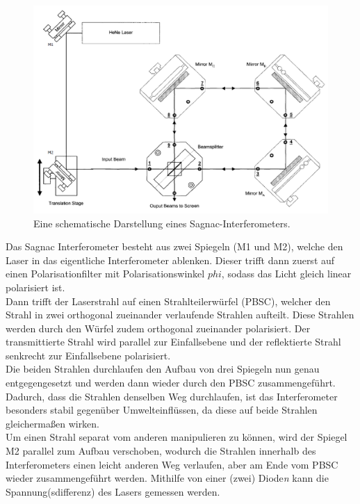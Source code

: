 \begin{figure}
    \centering
    \includegraphics[scale=0.4]{content/V64_pictures/Aufbau.png}
    \caption{Eine schematische Darstellung eines Sagnac-Interferometers. \cite{v64}}
    \label{fig:Aufbau}
\end{figure}
Das Sagnac Interferometer besteht aus zwei Spiegeln (M1 und M2), welche den Laser in das eigentliche Interferometer ablenken. Dieser trifft dann 
zuerst auf einen Polarisationfilter mit Polarisationswinkel $phi$, sodass das Licht gleich linear polarisiert ist.\\
Dann trifft der Laserstrahl auf einen Strahlteilerwürfel (PBSC), welcher den Strahl in zwei orthogonal zueinander verlaufende Strahlen aufteilt. Diese Strahlen werden durch
den Würfel zudem orthogonal zueinander polarisiert. Der transmittierte Strahl wird parallel zur Einfallsebene und der reflektierte Strahl senkrecht
zur Einfallsebene polarisiert.\\
Die beiden Strahlen durchlaufen den Aufbau von drei Spiegeln nun genau entgegengesetzt und werden dann wieder durch den PBSC zusammengeführt. Dadurch, dass
die Strahlen denselben Weg durchlaufen, ist das Interferometer besonders stabil gegenüber Umwelteinflüssen, da diese auf beide Strahlen gleichermaßen wirken.\\
Um einen Strahl separat vom anderen manipulieren zu können, wird der Spiegel M2 parallel zum Aufbau verschoben, wodurch die Strahlen innerhalb des Interferometers einen
leicht anderen Weg verlaufen, aber am Ende vom PBSC wieder zusammengeführt werden. Mithilfe von einer (zwei) Diode\textit{n} kann die Spannung(sdifferenz) des Lasers
gemessen werden.

